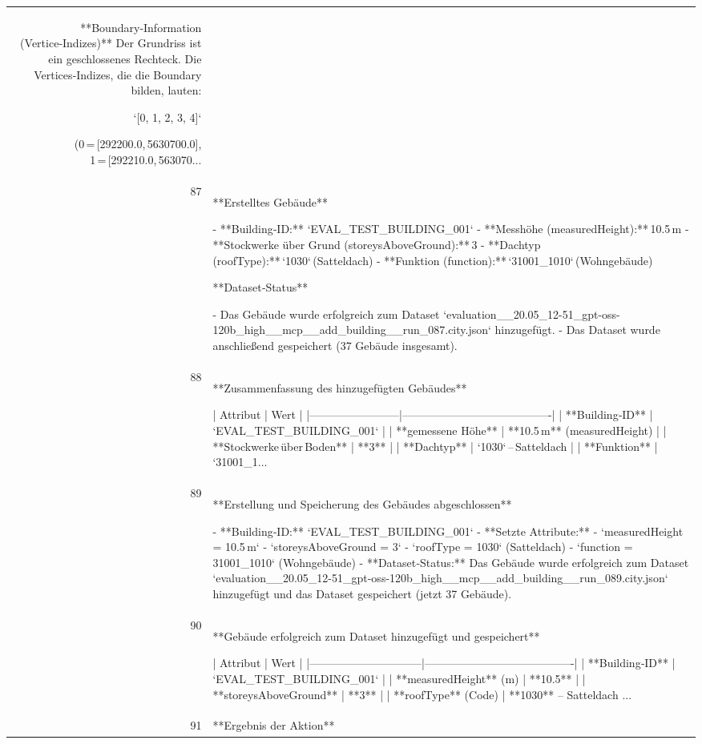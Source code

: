 \documentclass[a4paper,11pt]{article}
\begin{document}
\begin{table}[ht]
\begin{tabular}{r p{12cm}}
**Boundary‑Information (Vertice‑Indizes)**  
Der Grundriss ist ein geschlossenes Rechteck. Die Vertices‑Indizes, die die Boundary bilden, lauten:  

`[0, 1, 2, 3, 4]`  

(0 = [292200.0, 5630700.0], 1 = [292210.0, 563070... \\
87 & **Erstelltes Gebäude**

- **Building‑ID:** `EVAL\_TEST\_BUILDING\_001`  
- **Messhöhe (measuredHeight):** 10.5 m  
- **Stockwerke über Grund (storeysAboveGround):** 3  
- **Dachtyp (roofType):** `1030` (Satteldach)  
- **Funktion (function):** `31001\_1010` (Wohngebäude)  

**Dataset‑Status**

- Das Gebäude wurde erfolgreich zum Dataset `evaluation\_\_20.05\_12-51\_gpt-oss-120b\_high\_\_mcp\_\_add\_building\_\_run\_087.city.json` hinzugefügt.  
- Das Dataset wurde anschließend gespeichert (37 Gebäude insgesamt). \\
88 & **Zusammenfassung des hinzugefügten Gebäudes**

| Attribut                | Wert                                   |
|------------------------|----------------------------------------|
| **Building‑ID**        | `EVAL\_TEST\_BUILDING\_001`                |
| **gemessene Höhe**      | **10.5 m** (measuredHeight)            |
| **Stockwerke über Boden** | **3**                                   |
| **Dachtyp**             | `1030` – Satteldach                    |
| **Funktion**            | `31001\_1... \\
89 & **Erstellung und Speicherung des Gebäudes abgeschlossen**

- **Building‑ID:** `EVAL\_TEST\_BUILDING\_001`  
- **Setzte Attribute:**  
  - `measuredHeight = 10.5 m`  
  - `storeysAboveGround = 3`  
  - `roofType = 1030` (Satteldach)  
  - `function = 31001\_1010` (Wohngebäude)  
- **Dataset‑Status:** Das Gebäude wurde erfolgreich zum Dataset `evaluation\_\_20.05\_12-51\_gpt-oss-120b\_high\_\_mcp\_\_add\_building\_\_run\_089.city.json` hinzugefügt und das Dataset gespeichert (jetzt 37 Gebäude). \\
90 & **Gebäude erfolgreich zum Dataset hinzugefügt und gespeichert**

| Attribut                     | Wert                                   |
|------------------------------|----------------------------------------|
| **Building‑ID**              | `EVAL\_TEST\_BUILDING\_001`                |
| **measuredHeight** (m)       | **10.5**                               |
| **storeysAboveGround**       | **3**                                  |
| **roofType** (Code)          | **1030** – Satteldach          ... \\
91 & **Ergebnis der Aktion**


\end{tabular}
\end{table}
\end{document}
